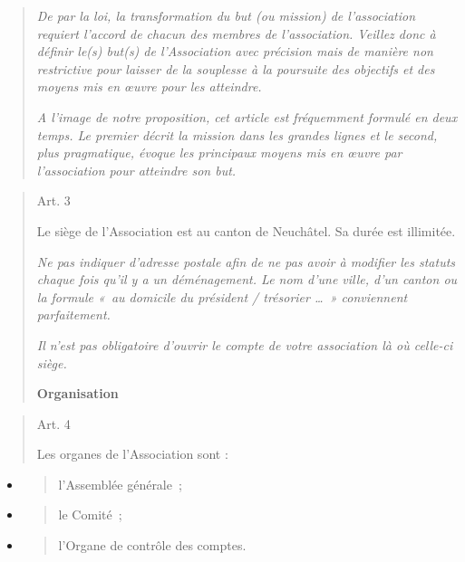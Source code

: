 \documentclass[10pt]{article}
\begin{document}
\begin{quote}
\emph{De par la loi, la transformation du but (ou mission) de
l'association requiert l'accord de chacun des membres de l'association.
Veillez donc à définir le(s) but(s) de l'Association avec précision mais
de manière non restrictive pour laisser de la souplesse à la poursuite
des objectifs et des moyens mis en œuvre pour les atteindre.}

\emph{A l'image de notre proposition, cet article est fréquemment
formulé en deux temps. Le premier décrit la mission dans les grandes
lignes et le second, plus pragmatique, évoque les principaux moyens mis
en œuvre par l'association pour atteindre son but.}

\end{quote}
\begin{quote}
Art. 3

Le siège de l'Association est au canton de Neuchâtel. Sa durée est illimitée.

\emph{Ne pas indiquer d'adresse postale afin de ne pas avoir à modifier
les statuts chaque fois qu'il y a un déménagement. Le nom d'une ville,
d'un canton ou la formule «~au domicile du président / trésorier
\ldots~» conviennent parfaitement.}

\emph{Il n'est pas obligatoire d'ouvrir le compte de votre association
là où celle-ci siège.}

\textbf{Organisation}

\end{quote}
\begin{quote}
Art. 4

Les organes de l'Association sont :
\end{quote}

\begin{itemize}
\item
  \begin{quote}
  l'Assemblée générale~;
  \end{quote}
\item
  \begin{quote}
  le Comité~;
  \end{quote}
\item
  \begin{quote}
  l'Organe de contrôle des comptes.
  \end{quote}
\end{itemize}
\end{document}
